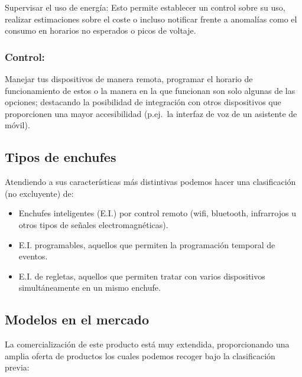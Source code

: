 \documentclass[a4paper,10pt]{article}
\begin{document}
Supervisar el uso de energía: Esto permite establecer un control sobre
su uso, realizar estimaciones sobre el coste o incluso notificar frente
a anomalías como el consumo en horarios no esperados o picos de voltaje.

\subsubsection{Control:}\label{control}

Manejar tus dispositivos de manera remota, programar el horario de
funcionamiento de estos o la manera en la que funcionan son solo algunas
de las opciones; destacando la posibilidad de integración con otros
dispositivos que proporcionen una mayor accesibilidad (p.ej.\ la interfaz
de voz de un asistente de móvil).

\subsection{Tipos de enchufes}\label{tipos-de-enchufes}

Atendiendo a sus características más distintivas podemos hacer una
clasificación (no excluyente) de:

\begin{itemize}
\item
  Enchufes inteligentes (E.I.) por control remoto (wifi, bluetooth,
  infrarrojos u otros tipos de señales electromagnéticas).
\item
  E.I. programables, aquellos que permiten la programación temporal de eventos.
\item
  E.I. de regletas, aquellos que permiten tratar con varios
  dispositivos simultáneamente en un mismo enchufe.
\end{itemize}

\subsection{Modelos en el mercado}\label{modelos-en-el-mercado}

La comercialización de este producto está muy extendida, proporcionando
una amplia oferta de productos los cuales podemos recoger bajo la
clasificación previa:
\end{document}
